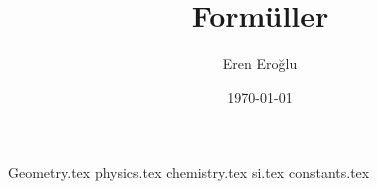 \documentclass[a4paper, 10pt]{report}
\author{Eren Eroğlu}
\date{\today}
\title{Formüller}
\begin{document}
    \newtheorem*{theorem}{Teori}
    \theoremstyle{definition}
    \newtheorem*{definition}{Tanım}
    \maketitle
    \tableofcontents
    {Geometry.tex}
    {physics.tex}
    {chemistry.tex}
    {si.tex}
    {constants.tex}
\end{document}
